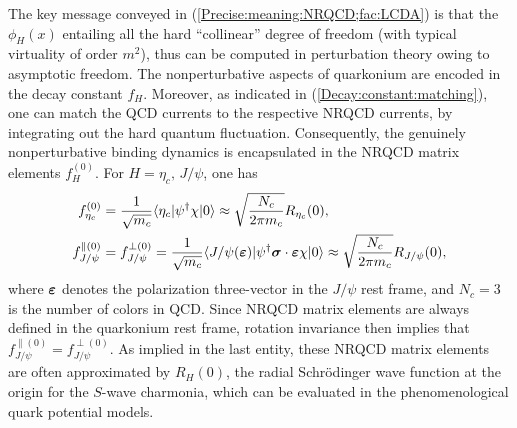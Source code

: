 \documentclass[english,preprint,aps,prd,showpacs,superscriptaddress,nofootinbib,tightenlines]{revtex4}
\def\bfsigma{\mbox{\boldmath $\sigma$}}
\def\bfvarepsilon{\mbox{\boldmath $\varepsilon$}}
\begin{document}
The key message conveyed in (\ref{Precise:meaning:NRQCD;fac:LCDA}) is that the
$\phi_H(x)$ entailing all the hard ``collinear'' degree of freedom
(with typical virtuality of order $m^2$), thus can be computed in perturbation theory owing to asymptotic freedom.
The nonperturbative aspects of quarkonium are encoded
in the decay constant $f_H$.
Moreover, as indicated in (\ref{Decay:constant:matching}), one can match the QCD currents to the respective NRQCD
currents, by integrating out the hard quantum fluctuation. Consequently,
the genuinely nonperturbative binding dynamics is
encapsulated in the NRQCD matrix elements $f_{H}^{(0)}$.
For $H=\eta_c,\,J/\psi$, one has
\begin{subequations}
\begin{align}
f_{\eta_c}^{(0)} &= {1\over \sqrt{m_c}} \langle \eta_c| \psi^\dagger \chi|0\rangle  \approx
\sqrt{N_c\over 2\pi m_c} R_{\eta_c}(0), \\
f_{J/\psi}^{\parallel(0)} &= f_{J/\psi}^{\perp (0)}= {1\over \sqrt{m_c}} \langle J/\psi(\bfvarepsilon)| \psi^\dagger\bfsigma\cdot
\bfvarepsilon \chi|0\rangle \approx \sqrt{N_c\over 2\pi m_c} R_{J/\psi}(0),
\end{align}
\label{Def:NRQCD:vac:to:H:matrix:element}
\end{subequations}
where $\bfvarepsilon$ denotes the polarization three-vector in the $J/\psi$ rest frame,
and $N_c=3$ is the number of colors in QCD. Since NRQCD matrix elements are always defined in the quarkonium rest frame,
rotation invariance then implies that $f_{J/\psi}^{\parallel(0)} = f_{J/\psi}^{\perp(0)}$.
As implied in the last entity, these NRQCD matrix elements are often approximated by $R_H(0)$,
the radial Schr\"{o}dinger wave function at the origin for the $S$-wave charmonia,
which can be evaluated in the phenomenological quark potential models.



\end{document}
